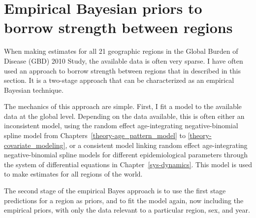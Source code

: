 \section{Empirical Bayesian priors to borrow strength between regions}
\label{empirical-priors}

When making estimates for all 21 geographic regions in the Global
Burden of Disease (GBD) 2010 Study, the available data is often very
sparse.  I have often used an approach to borrow strength between
regions that in described in this section.  It is a two-stage approach
that can be characterized as an empirical Bayesian technique.

The mechanics of this approach are simple.  First, I fit a model to
the available data at the global level.  Depending on the data
available, this is often either an inconsistent model, using the
random effect age-integrating negative-binomial spline model from
Chapters~\ref{theory-age_pattern_model} to
\ref{theory-covariate_modeling}, or a consistent model linking random
effect age-integrating negative-binomial spline models for different
epidemiological parameters through the system of differential
equations in Chapter~\ref{sys-dynamics}.  This model is used to make
estimates for all regions of the world.

The second stage of the empirical Bayes approach is to use the first
stage predictions for a region as priors, and to fit the model again,
now including the empirical priors, with only the data relevant to a
particular region, sex, and year.





